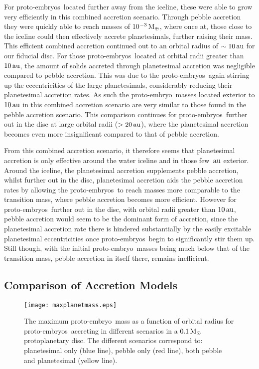 \documentclass[a4paper,fleqn,usenatbib]{mnras}
\newcommand{\me}{{\, {\rm M}_{\oplus}}}
\newcommand{\msun}{{\, {\rm M}_{\odot}}}
\newcommand{\au}{{\, {\rm au}}}
\newcommand{\emb}{{{proto-embryo~}}}
\newcommand{\embs}{{{proto-embryos~}}}
\begin{document}
For \embs located further away from the iceline, these were able to grow very efficiently in this combined accretion scenario.
Through pebble accretion they were quickly able to reach masses of 10$^{-3}\me$, where once at, those close to the iceline could then effectively accrete planetesimals, further raising their mass.
This efficient combined accretion continued out to an orbital radius of $\sim 10\au$ for our fiducial disc.
For those \embs located at orbital radii greater than $10 \au$, the amount of solids accreted through planetesimal accretion was negligible compared to pebble accretion.
This was due to the \embs again stirring up the eccentricities of the large planetesimals, considerably reducing their planetesimal accretion rates.
As such the \emb masses located exterior to $10\au$ in this combined accretion scenario are very similar to those found in the pebble accretion scenario.
This comparison continues for \embs further out in the disc at large orbital radii ($>20\au$), where the planetesimal accretion becomes even more insignificant compared to that of pebble accretion.

From this combined accretion scenario, it therefore seems that planetesimal accretion is only effective around the water iceline and in those few $\au$ exterior.
Around the iceline, the planetesimal accretion supplements pebble accretion, whilst further out in the disc, planetesimal accretion aids the pebble accretion rates by allowing the \embs to reach masses more comparable to the transition mass, where pebble accretion becomes more efficient.
However for \embs further out in the disc, with orbital radii greater than $10\au$, pebble accretion would seem to be the dominant form of accretion, since the planetesimal accretion rate there is hindered substantially by the easily excitable planetesimal eccentricities once \embs begin to significantly stir them up.
Still though, with the initial \emb masses being much below that of the transition mass, pebble accretion in itself there, remains inefficient.

\subsection{Comparison of Accretion Models}
\label{sec:acc_comparison}

\begin{figure}
\centering
\texttt{[image: maxplanetmass.eps]}
\caption{The maximum \emb mass as a function of orbital radius for \embs accreting in different scenarios in a $0.1 \msun$ protoplanetary disc. The different scenarios correspond to: planetesimal only (blue line), pebble only (red line), both pebble and planetesimal (yellow line).}
\label{fig:max_planet_mass}
\end{figure}
\end{document}
